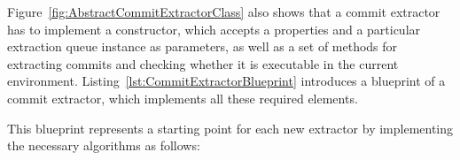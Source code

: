 Figure~\ref{fig:AbstractCommitExtractorClass} also shows that a commit extractor has to implement a constructor, which accepts a properties and a particular extraction queue instance as parameters, as well as a set of methods for extracting commits and checking whether it is executable in the current environment. Listing~\ref{lst:CommitExtractorBlueprint} introduces a blueprint of a commit extractor, which implements all these required elements.


\begin{figure}[ht]
	\centering
		
\end{figure}

This blueprint represents a starting point for each new extractor by implementing the necessary algorithms as follows:


